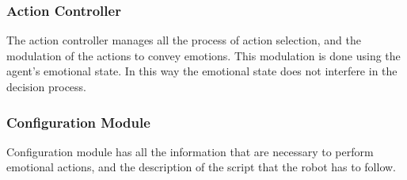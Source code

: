\subsubsection{Action Controller}
The action controller manages all the process of action selection, and the modulation of the actions to convey emotions. This modulation is done using the agent's emotional state. In this way the emotional state does not interfere in the decision process.
\subsubsection{Configuration Module}
Configuration module has all the information that are necessary to perform emotional actions, and the description of the script that the robot has to follow.